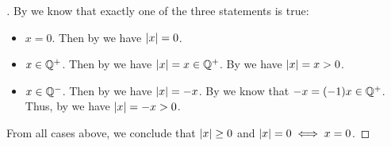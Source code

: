 \begin{proof}[]
  By  we know that exactly one of the three statements is true:
  \begin{itemize}
    \item \(x = 0\).
          Then by  we have \(\left\lvert x\right\rvert = 0\).
    \item \(x \in \mathbb{Q}^+\).
          Then by  we have \(\left\lvert x\right\rvert = x \in \mathbb{Q}^+\).
          By  we have \(\left\lvert x\right\rvert = x > 0\).
    \item \(x \in \mathbb{Q}^-\).
          Then by  we have \(\left\lvert x\right\rvert = -x\).
          By  we know that \(-x = (-1)x \in \mathbb{Q}^+\).
          Thus, by  we have \(\left\lvert x\right\rvert = -x > 0\).
  \end{itemize}
  From all cases above, we conclude that \(\left\lvert x\right\rvert \geq 0\) and \(\left\lvert x\right\rvert = 0 \iff x = 0\).
\end{proof}

